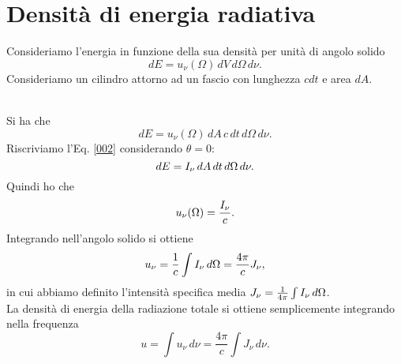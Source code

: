 \section{Densità di energia radiativa}
Consideriamo l'energia in funzione della sua densità per unità di angolo solido
\begin{equation*}
    dE = u_\nu(\Omega)\,dV\,d\Omega\,d\nu.
\end{equation*}
Consideriamo un cilindro attorno ad un fascio con lunghezza $cdt$ e area $dA$.
\begin{figure}[h!]
        \centering
\end{figure}
\\
Si ha che
\begin{equation*}
    dE=u_\nu(\Omega)\,dA\,c\,dt\,d\Omega\, d\nu.
\end{equation*}
Riscriviamo l'Eq. \ref{002} considerando $\theta=0$:
\begin{equation*}
    dE=I_\nu \,dA\,dt\,d\Omega\, d\nu.
\end{equation*}
Quindi ho che 
\begin{equation*}
    u_\nu(\Omega)=\frac{I_\nu}{c}.
\end{equation*}
Integrando nell'angolo solido si ottiene
\begin{equation}
    u_\nu = \frac{1}{c}\int I_\nu \,d\Omega = \frac{4\pi}{c}J_\nu,
    \label{003}
\end{equation}
in cui abbiamo definito l'intensità specifica media $J_\nu=\frac{1}{4\pi}\int I_\nu\, d\Omega$. \\
La densità di energia della radiazione totale si ottiene semplicemente integrando nella frequenza
\begin{equation*}
    u=\int u_\nu\,d\nu=\frac{4\pi}{c}\int J_\nu\,d\nu.
\end{equation*}
